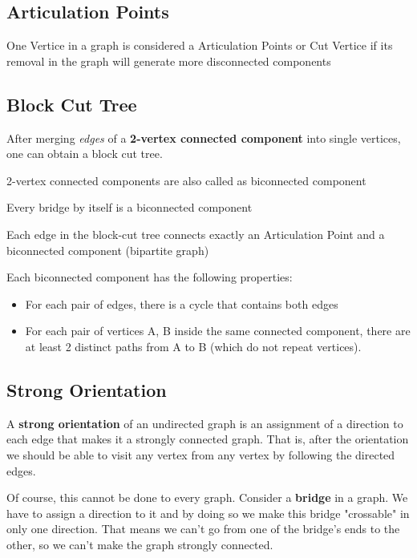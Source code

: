 	\subsection{Articulation Points} 

	One Vertice in a graph is considered a Articulation Points or Cut Vertice if its removal in the graph will generate more disconnected components


	\subsection{Block Cut Tree}

	After merging \textit{edges} of a \textbf{2-vertex connected component} into single vertices, one can obtain a block cut tree.

	2-vertex connected components are also called as biconnected component
	
	Every bridge by itself is a biconnected component

	Each edge in the block-cut tree connects exactly an Articulation Point and a biconnected component (bipartite graph)

	Each biconnected component has the following properties:

	\begin{itemize}
		\item For each pair of edges, there is a cycle that contains both edges
		\item For each pair of vertices {A, B} inside the same connected component, there are at least 2 distinct paths from A to B (which do not repeat vertices).
	\end{itemize}

	
	\subsection{Strong Orientation}

	A \textbf{strong orientation} of an undirected graph is an assignment of a direction to each edge that makes it a strongly connected graph.
	That is, after the orientation we should be able to visit any vertex from any vertex by following the directed edges.

	Of course, this cannot be done to every graph. Consider a \textbf{bridge} in a graph.
	We have to assign a direction to it and by doing so we make this bridge "crossable" in only one direction.
	That means we can't go from one of the bridge's ends to the other, so we can't make the graph strongly connected.

